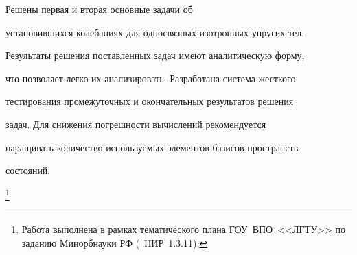 \smallskip



 Решены первая и вторая основные задачи об

установившихся колебаниях для односвязных изотропных упругих тел.

Результаты решения поставленных задач имеют аналитическую форму,

что позволяет легко их анализировать. Разработана система жесткого

тестирования промежуточных и окончательных результатов решения

задач. Для снижения погрешности вычислений рекомендуется

наращивать количество используемых элементов базисов пространств

состояний.



\thanks{Работа выполнена в рамках тематического плана ГОУ~ВПО~<<ЛГТУ>> по заданию Минорбнауки РФ (\No\ НИР~1.3.11).}





